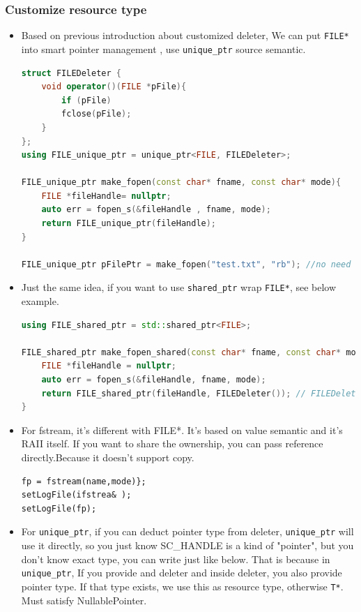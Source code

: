 \documentclass[a4paper,11pt,twoside]{book}
\begin{document}
\subsubsection{Customize resource type}
\begin{itemize}
	
		\item Based on previous introduction about customized deleter, We can put \texttt{FILE*} into smart pointer management , use \texttt{unique\_ptr} source semantic.
\begin{lstlisting}[frame=single, language=c++]
struct FILEDeleter {
	void operator()(FILE *pFile){
		if (pFile)
		fclose(pFile);
	}
};
using FILE_unique_ptr = unique_ptr<FILE, FILEDeleter>;

FILE_unique_ptr make_fopen(const char* fname, const char* mode){
	FILE *fileHandle= nullptr;
	auto err = fopen_s(&fileHandle , fname, mode);  
	return FILE_unique_ptr(fileHandle); 
}

FILE_unique_ptr pFilePtr = make_fopen("test.txt", "rb"); //no need to call fclose
\end{lstlisting}		
		
		\item Just the same idea, if you want to use \texttt{shared\_ptr} wrap \texttt{FILE*}, see below example.
\begin{lstlisting}[frame=single, language=c++]
using FILE_shared_ptr = std::shared_ptr<FILE>;

FILE_shared_ptr make_fopen_shared(const char* fname, const char* mode){
	FILE *fileHandle = nullptr;
	auto err = fopen_s(&fileHandle, fname, mode);
	return FILE_shared_ptr(fileHandle, FILEDeleter()); // FILEDeleter() is varaible, not type
}	
\end{lstlisting}		
		
		\item For fstream, it's different with FILE*. It's based on value semantic and it's RAII itself. If you want to share the ownership, you can pass reference directly.Because it doesn't support copy.
		
\begin{lstlisting}[numbers=none]
fp = fstream(name,mode)};
setLogFile(ifstrea& );
setLogFile(fp);
\end{lstlisting}

	
		\item For \texttt{unique\_ptr}, if you can deduct pointer type from deleter, \texttt{unique\_ptr} will use it directly, so you just know SC\_HANDLE is a kind of "pointer", but you don't know exact type, you can write just like below.  That is because in \texttt{unique\_ptr}, If you provide and deleter and inside deleter, you also provide pointer type. If that type exists, we use this as resource type, otherwise \texttt{T*}. Must satisfy NullablePointer.


\end{itemize}
\end{document}
